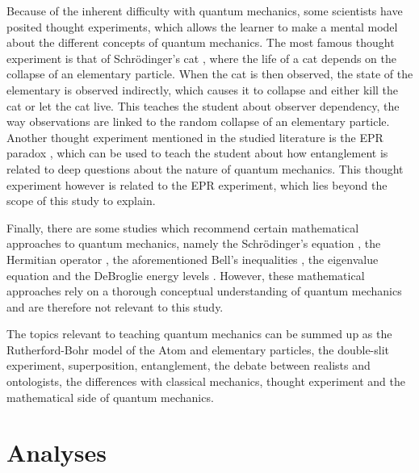 \documentclass[11pt,twoside]{report} %
\begin{document}
Because of the inherent difficulty with quantum mechanics, some scientists have posited thought experiments, which allows the learner to make a mental model about the different concepts of quantum mechanics. The most famous thought experiment is that of Schrödinger's cat \cite{muller, velentzas}, where the life of a cat depends on the collapse of an elementary particle. When the cat is then observed, the state of the elementary is observed indirectly, which causes it to collapse and either kill the cat or let the cat live. This teaches the student about observer dependency, the way observations are linked to the random collapse of an elementary particle. Another thought experiment mentioned in the studied literature is the EPR paradox \cite{kuttner, muller, velentzas}, which can be used to teach the student about how entanglement is related to deep questions about the nature of quantum mechanics. This thought experiment however is related to the EPR experiment, which lies beyond the scope of this study to explain.

Finally, there are some studies which recommend certain mathematical approaches to quantum mechanics, namely the Schrödinger's equation \cite{muller, singh2}, the Hermitian operator \cite{singh2}, the aforementioned Bell's inequalities \cite{kuttner, muller}, the eigenvalue equation \cite{muller} and the DeBroglie energy levels \cite{dori, gianino, mckagan}. However, these mathematical approaches rely on a thorough conceptual understanding of quantum mechanics and are therefore not relevant to this study.

The topics relevant to teaching quantum mechanics can be summed up as the Rutherford-Bohr model of the Atom and elementary particles, the double-slit experiment, superposition, entanglement, the debate between realists and ontologists, the differences with classical mechanics, thought experiment and the mathematical side of quantum mechanics.

\part{Analyses}
\thispagestyle{fancy}
\end{document}
